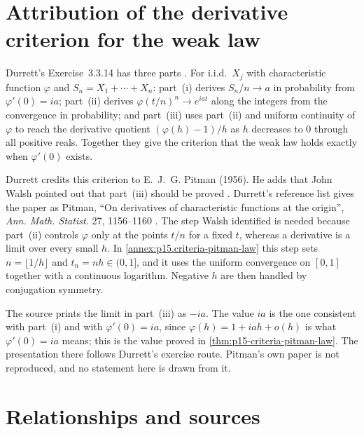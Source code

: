 \section{Attribution of the derivative criterion for the weak law}
\label{sec:p15-w02c-p15-013-pitman}

Durrett's Exercise~3.3.14 has three parts
\cite[p.~136, Exercise~3.3.14]{DurrettPTEAuthor2019}. For i.i.d.\ \(X_j\)
with characteristic function \(\varphi\) and \(S_n=X_1+\cdots+X_n\):
part~(i) derives \(S_n/n\to a\) in probability from \(\varphi'(0)=ia\);
part~(ii) derives \(\varphi(t/n)^n\to e^{iat}\) along the integers from the
convergence in probability; and part~(iii) uses part~(ii) and uniform
continuity of \(\varphi\) to reach the derivative quotient
\((\varphi(h)-1)/h\) as \(h\) decreases to \(0\) through all positive reals.
Together they give the criterion that the weak law holds exactly when
\(\varphi'(0)\) exists.

Durrett credits this criterion to E.~J.~G. Pitman (1956). He adds that John
Walsh pointed out that part~(iii) should be proved
\cite[p.~136]{DurrettPTEAuthor2019}. Durrett's reference list gives the
paper as Pitman, ``On derivatives of characteristic functions at the
origin'', \emph{Ann. Math. Statist.} 27, 1156--1160
\cite[p.~481]{DurrettPTEAuthor2019}. The step Walsh identified is needed
because part~(ii) controls \(\varphi\) only at the points \(t/n\) for a
fixed \(t\), whereas a derivative is a limit over every small \(h\). In
\cref{annex:p15.criteria-pitman-law} this step sets \(n=\lfloor1/h\rfloor\)
and \(t_n=nh\in(0,1]\), and it uses the uniform convergence on \([0,1]\)
together with a continuous logarithm. Negative \(h\) are then handled by
conjugation symmetry.

The source prints the limit in part~(iii) as \(-ia\). The value \(ia\) is
the one consistent with part~(i) and with \(\varphi'(0)=ia\), since
\(\varphi(h)=1+iah+o(h)\) is what \(\varphi'(0)=ia\) means; this is the
value proved in \cref{thm:p15-criteria-pitman-law}. The presentation there
follows Durrett's exercise route. Pitman's own paper is not reproduced, and
no statement here is drawn from it.

\section{Relationships and sources}
\label{sec:p15-w02c-p15-013-relationships}

